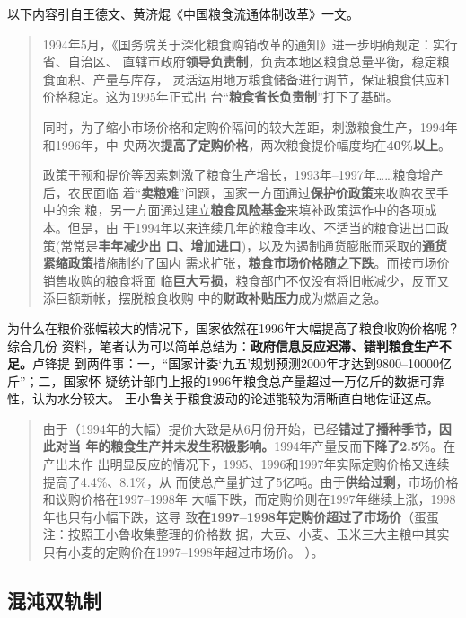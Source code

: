 以下内容引自王德文、黄济焜《中国粮食流通体制改革》一文。
\begin{quotation}
  1994年5月，《国务院关于深化粮食购销改革的通知》进一步明确规定：实行省、自治区、
  直辖市政府\textbf{领导负责制}，负责本地区粮食总量平衡，稳定粮食面积、产量与库存，
  灵活运用地方粮食储备进行调节，保证粮食供应和价格稳定。这为1995年正式出
  台“\textbf{粮食省长负责制}”打下了基础。

  同时，为了缩小市场价格和定购价隔间的较大差距，刺激粮食生产，1994年和1996年，中
  央两次\textbf{提高了定购价格}，两次粮食提价幅度均在\textbf{40\%以上}。

  政策干预和提价等因素刺激了粮食生产增长，1993年--1997年……粮食增产后，农民面临
  着“\textbf{卖粮难}”问题，国家一方面通过\textbf{保护价政策}来收购农民手中的余
  粮，另一方面通过建立\textbf{粮食风险基金}来填补政策运作中的各项成本。但是，由
  于1994年以来连续几年的粮食丰收、不适当的粮食进出口政策(常常是\textbf{丰年减少出
    口、增加进口})，以及为遏制通货膨胀而采取的\textbf{通货紧缩政策}措施制约了国内
  需求扩张，\textbf{粮食市场价格随之下跌}。而按市场价销售收购的粮食将面
  临\textbf{巨大亏损}，粮食部门不仅没有将旧帐减少，反而又添巨额新帐，摆脱粮食收购
  中的\textbf{财政补贴压力}成为燃眉之急。
\end{quotation}

为什么在粮价涨幅较大的情况下，国家依然在1996年大幅提高了粮食收购价格呢？综合几份
资料，笔者认为可以简单总结为：\textbf{政府信息反应迟滞、错判粮食生产不足。}卢锋提
到两件事：一，“国家计委‘九五’规划预测2000年才达到9800--10000亿斤”；二，国家怀
疑统计部门上报的1996年粮食总产量超过一万亿斤的数据可靠性，认为水分较大。
王小鲁关于粮食波动的论述能较为清晰直白地佐证这点。
\begin{quotation}
  由于（1994年的大幅）提价大致是从6月份开始，已经\textbf{错过了播种季节，因此对当
    年的粮食生产并未发生积极影响。}1994年产量反而\textbf{下降了2.5\%}。在产出未作
  出明显反应的情况下，1995、1996和1997年实际定购价格又连续提高了4.4\%、8.1\%，从
  而使总产量扩过了5亿吨。由于\textbf{供给过剩}，市场价格和议购价格在1997--1998年
  大幅下跌，而定购价则在1997年继续上涨，1998年也只有小幅下跌，这导
  致\textbf{在1997--1998年定购价超过了市场价}（蛋蛋注：按照王小鲁收集整理的价格数
  据，大豆、小麦、玉米三大主粮中其实只有小麦的定购价在1997--1998年超过市场价。
  ）。\cite{wangxiaoluliangshi}
\end{quotation}


\subsection{混沌双轨制}

